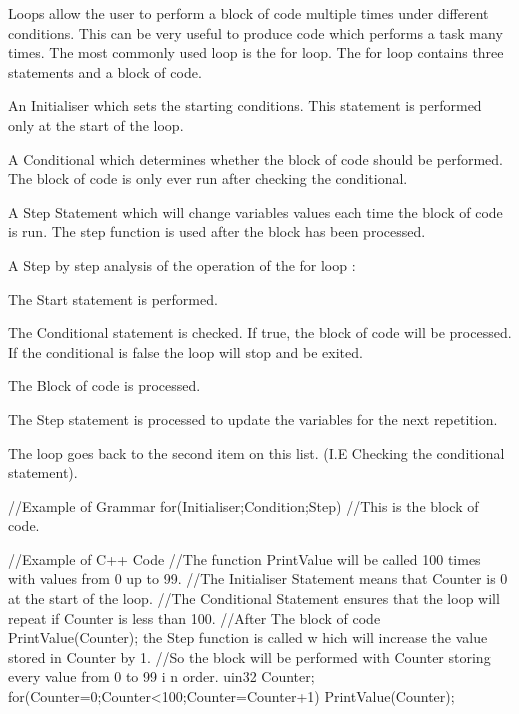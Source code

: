 Loops allow the user to perform a block of code multiple times under different conditions. This can be very useful to produce code which performs a task many times. The most commonly used loop is the for loop. The for loop contains three statements and a block of code.
\begin{DoxyItemize}
\item An Initialiser which sets the starting conditions. This statement is performed only at the start of the loop.
\item A Conditional which determines whether the block of code should be performed. The block of code is only ever run after checking the conditional.
\item A Step Statement which will change variables values each time the block of code is run. The step function is used after the block has been processed.
\end{DoxyItemize}A Step by step analysis of the operation of the for loop :
\begin{DoxyItemize}
\item The Start statement is performed.
\item The Conditional statement is checked. If true, the block of code will be processed. If the conditional is false the loop will stop and be exited.
\item The Block of code is processed.
\item The Step statement is processed to update the variables for the next repetition.
\item The loop goes back to the second item on this list. (I.E Checking the conditional statement).
\end{DoxyItemize}
\begin{DoxyCode}
 //Example of Grammar
 for(Initialiser;Condition;Step)
 {
  //This is the block of code.
 }
\end{DoxyCode}
 
\begin{DoxyCode}
 //Example of C++ Code
 //The function PrintValue will be called 100 times with values from 0 up to 99.
 //The Initialiser Statement means that Counter is 0 at the start of the loop.
 //The Conditional Statement ensures that the loop will repeat if Counter is less
       than 100.
 //After The block of code { PrintValue(Counter); } the Step function is called w
      hich will increase the value stored in Counter by 1.
 //So the block will be performed with Counter storing every value from 0 to 99 i
      n order.
 uin32 Counter;
 for(Counter=0;Counter<100;Counter=Counter+1)
 {
        PrintValue(Counter);
 }
\end{DoxyCode}
 
